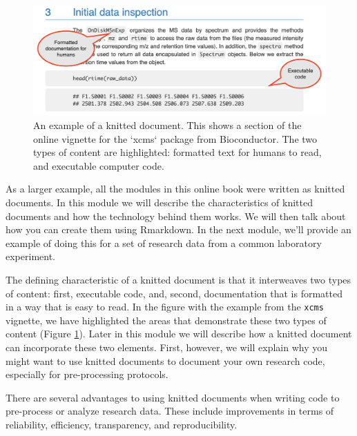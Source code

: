 \documentclass[]{tufte-book}
\begin{document}
\begin{figure}
\includegraphics[width=\textwidth]{figures/vignette_example_annotated} \caption[An example of a knitted document]{An example of a knitted document. This shows a section of the online vignette for the `xcms` package from Bioconductor. The two types of content are highlighted: formatted text for humans to read, and executable computer code.}\label{fig:xcmsexample}
\end{figure}

As a larger example, all the modules in this online book were written as knitted
documents. In this module we will describe the characteristics of knitted
documents and how the technology behind them works. We will then talk about how
you can create them using Rmarkdown. In the next module, we'll provide an
example of doing this for a set of research data from a common laboratory
experiment.

The defining characteristic of a knitted document is that it interweaves two
types of content: first, executable code, and, second, documentation that is
formatted in a way that is easy to read. In the figure with the example from the
\texttt{xcms} vignette, we have highlighted the areas that demonstrate these two types
of content (Figure \ref{fig:xcmsexample}). Later in this module we will
describe how a knitted document can incorporate these two elements. First,
however, we will explain why you might want to use knitted documents to
document your own research code, especially for pre-processing protocols.

There are several advantages to using knitted documents when writing code to
pre-process or analyze research data. These include improvements in terms of
reliability, efficiency, transparency, and reproducibility.
\end{document}
